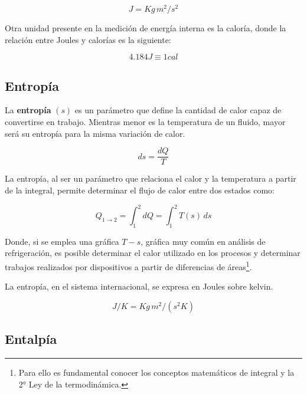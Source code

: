 \begin{equation}\label{EA1-Energía interna unidades}
    J = Kg \, m^2/s^2
\end{equation}

Otra unidad presente en la medición de energía interna es la caloría, donde la relación entre Joules y calorías es la siguiente:

\begin{equation}\label{EA1-Energía interna Relación entre unidades}
    4.184 J \equiv 1cal
\end{equation}


\subsection{Entropía}

\begin{defs}
    La \textbf{entropía} $(s)$ es un parámetro que define la cantidad de calor capaz de convertirse en trabajo. Mientras menor es la temperatura de un fluido, mayor será su entropía para la misma variación de calor.

    \begin{equation}\label{EA1-Entropía}
        ds = \dfrac{dQ}{T}
    \end{equation}
\end{defs}

La entropía, al ser un parámetro que relaciona el calor y la temperatura a partir de la integral, permite determinar el flujo de calor entre dos estados como:

\begin{equation}
    Q_{1\rightarrow2} = \int_{1}^{2} dQ = \int_{1}^{2} T(s) \, ds 
\end{equation}

Donde, si se emplea una gráfica $T-s$, gráfica muy común en análisis de refrigeración, es posible determinar el calor utilizado en los procesos y determinar trabajos realizados por dispositivos a partir de diferencias de áreas\footnote{Para ello es fundamental conocer los conceptos matemáticos de integral y la 2° Ley de la termodinámica.}.

La entropía, en el sistema internacional, se expresa en Joules sobre kelvin.

\begin{equation}\label{EA1-entropía Relación entre unidades}
    J/K = Kg \, m^2 /(s^2 K)
\end{equation}

\subsection{Entalpía}


